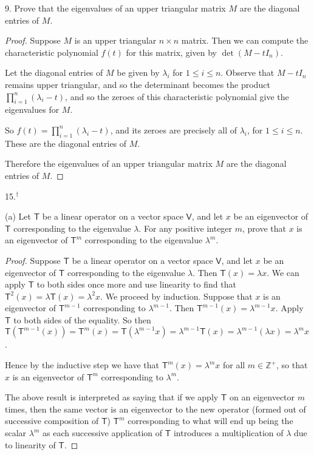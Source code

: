 \documentclass[11pt]{article}
\newcommand{\br}[1]{\left(#1\right)}
\begin{document}
9. Prove that the eigenvalues of an upper triangular matrix $M$ are the diagonal entries of $M$.

\begin{proof}
  Suppose $M$ is an upper triangular $n\times n$ matrix. Then we can compute the characteristic polynomial $f(t)$ for this matrix, given by $\det(M-tI_n)$.

  Let the diagonal entries of $M$ be given by $\lambda_i$ for $1\leq i\leq n $. Observe that $M-tI_n$ remains upper triangular, and so the determinant becomes the product $\prod_{i=1}^n (\lambda_i-t)$, and so the zeroes of this characteristic polynomial give the eigenvalues for $M$.

  So $f(t) = \prod_{i=1}^n (\lambda_i-t)$, and its zeroes are precisely all of $\lambda_i$, for $1\leq i \leq n$. These are the diagonal entries of $M$. 

  Therefore the eigenvalues of an upper triangular matrix $M$ are the diagonal entries of $M$.
\end{proof}

15.$^{\dagger}$

(a) Let $\mathsf{T}$ be a linear operator on a vector space $\mathsf{V}$, and let $x$ be an eigenvector of $\mathsf{T}$ corresponding to the eigenvalue $\lambda$. For any positive integer $m$, prove that $x$ is an eigenvector of $\mathsf{T}^m$ corresponding to the eigenvalue $\lambda^m$.

\begin{proof}
  Suppose $\mathsf{T}$ be a linear operator on a vector space $\mathsf{V}$, and let $x$ be an eigenvector of $\mathsf{T}$ corresponding to the eigenvalue $\lambda$. Then $\mathsf{T}(x) = \lambda x$. We can apply $\mathsf{T}$ to both sides once more and use linearity to find that $\mathsf{T}^2(x) = \lambda \mathsf{T}(x) = \lambda^2 x$. We proceed by induction. Suppose that $x$ is an eigenvector of $\mathsf{T}^{m-1}$ corresponding to $\lambda^{m-1}$. Then $\mathsf{T}^{m-1}(x) = \lambda^{m-1} x$. Apply $\mathsf{T}$ to both sides of the equality. So then $\mathsf{T}(\mathsf{T}^{m-1}(x)) = \mathsf{T}^m(x) = \mathsf{T}(\lambda^{m-1} x) = \lambda^{m-1}\mathsf{T}(x) = \lambda^{m-1}\br{\lambda x} = \lambda^m x$. 
  
  Hence by the inductive step we have that $\mathsf{T}^m(x) = \lambda^m x$ for all $m\in\mathbb{Z}^{+}$, so that $x$ is an eigenvector of $\mathsf{T}^m$ corresponding to $\lambda^m$.

  The above result is interpreted as saying that if we apply $\mathsf{T}$ on an eigenvector $m$ times, then the same vector is an eigenvector to the new operator (formed out of successive composition of $\mathsf{T}$) $\mathsf{T}^m$ corresponding to what will end up being the scalar $\lambda^m$ as each successive application of $\mathsf{T}$ introduces a multiplication of $\lambda$ due to linearity of $\mathsf{T}$.
\end{proof}
\end{document}
